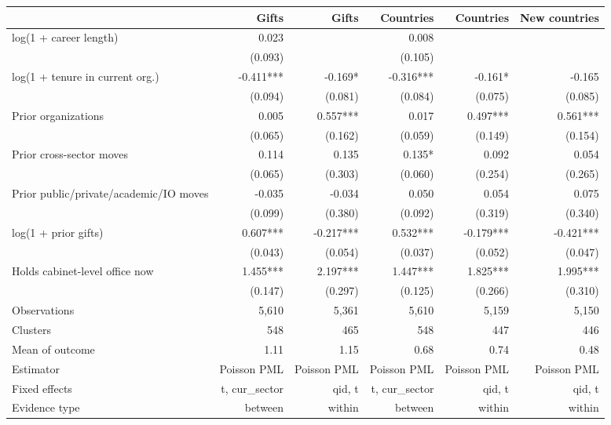 \begin{tabular}{lrrrrr}
\toprule
 & Gifts & Gifts & Countries & Countries & New countries \\
\midrule
log(1 + career length) & 0.023 &  & 0.008 &  &  \\
 & (0.093) &  & (0.105) &  &  \\
log(1 + tenure in current org.) & -0.411*** & -0.169* & -0.316*** & -0.161* & -0.165 \\
 & (0.094) & (0.081) & (0.084) & (0.075) & (0.085) \\
Prior organizations & 0.005 & 0.557*** & 0.017 & 0.497*** & 0.561*** \\
 & (0.065) & (0.162) & (0.059) & (0.149) & (0.154) \\
Prior cross-sector moves & 0.114 & 0.135 & 0.135* & 0.092 & 0.054 \\
 & (0.065) & (0.303) & (0.060) & (0.254) & (0.265) \\
Prior public/private/academic/IO moves & -0.035 & -0.034 & 0.050 & 0.054 & 0.075 \\
 & (0.099) & (0.380) & (0.092) & (0.319) & (0.340) \\
log(1 + prior gifts) & 0.607*** & -0.217*** & 0.532*** & -0.179*** & -0.421*** \\
 & (0.043) & (0.054) & (0.037) & (0.052) & (0.047) \\
Holds cabinet-level office now & 1.455*** & 2.197*** & 1.447*** & 1.825*** & 1.995*** \\
 & (0.147) & (0.297) & (0.125) & (0.266) & (0.310) \\
Observations & 5,610 & 5,361 & 5,610 & 5,159 & 5,150 \\
Clusters & 548 & 465 & 548 & 447 & 446 \\
Mean of outcome & 1.11 & 1.15 & 0.68 & 0.74 & 0.48 \\
Estimator & Poisson PML & Poisson PML & Poisson PML & Poisson PML & Poisson PML \\
Fixed effects & t, cur\_sector & qid, t & t, cur\_sector & qid, t & qid, t \\
Evidence type & between & within & between & within & within \\
\bottomrule
\end{tabular}
\par{}
